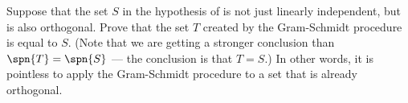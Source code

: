 Suppose that the set $S$ in the hypothesis of  is not just linearly independent, but is also orthogonal.  Prove that the set $T$ created by the Gram-Schmidt procedure is equal to $S$.  (Note that we are getting a stronger conclusion than $\spn{T}=\spn{S}$ --- the conclusion is that $T=S$.)  In other words, it is pointless to apply the Gram-Schmidt procedure to a set that is already orthogonal.